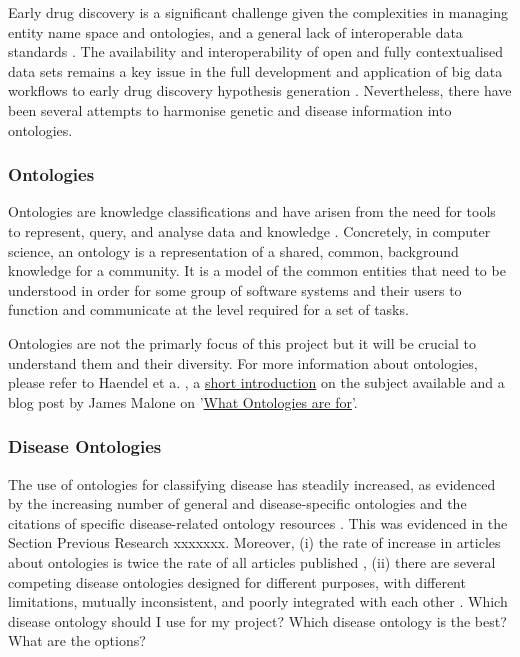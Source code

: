 Early drug discovery is a significant challenge given the complexities in managing entity name space and ontologies, and a general lack of interoperable data standards \cite{brown2018}. The availability and interoperability of open and fully contextualised data sets remains a key issue in the full development and application of big data workflows to early drug discovery hypothesis generation \cite{brown2018}. Nevertheless, there have been several attempts to harmonise genetic and disease information into ontologies.

\subsubsection{Ontologies}

Ontologies are knowledge classifications and have arisen from the need for tools to represent, query, and analyse data and knowledge \cite{haendel2018}. Concretely, in computer science, an ontology is a representation of a shared, common, background knowledge for a community. It is a model of the common entities that need to be understood in order for some group of software systems and their users to function and communicate at the level required for a set of tasks.

Ontologies are not the primarly focus of this project but it will be crucial to understand them and their diversity. For more information about ontologies, please refer to Haendel et a. \cite{haendel2018}, a \href{https://goo.gl/SLVqhi}{short introduction} on the subject available and a blog post by James Malone on  '\href{https://goo.gl/6bHDcv}{What Ontologies are for}'.

\subsubsection{Disease Ontologies}
The use of ontologies for classifying disease has steadily increased, as evidenced by the increasing number of general and disease-specific ontologies and the citations of specific disease-related ontology resources \cite{haendel2018}. This was evidenced in the Section Previous Research xxxxxxx. Moreover, (i) the rate of increase in articles about ontologies is twice the rate of all articles published \cite{haendel2018}, (ii) there are several competing disease ontologies designed for different purposes, with different limitations, mutually inconsistent, and poorly integrated with each other \cite{DISEASES2015}. Which disease ontology should I use for my project? Which disease ontology is the best? What are the options?

